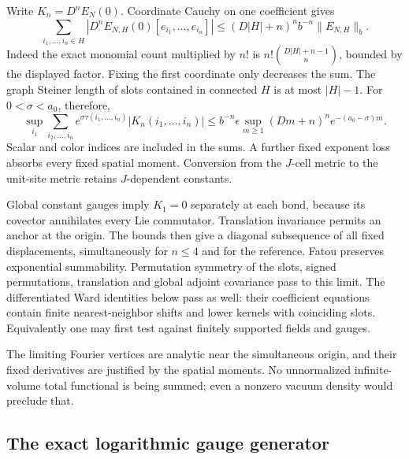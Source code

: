 \documentclass[11pt]{article}
\theoremstyle{remark}
\begin{document}
Write \(K_n=D^nE_N(0)\). Coordinate Cauchy on one coefficient gives
\begin{equation}
 \sum_{i_1,\ldots,i_n\in H}
  |D^nE_{N,H}(0)[e_{i_1},\ldots,e_{i_n}]|
 \le (D|H|+n)^n b^{-n}\|E_{N,H}\|_b .
 \label{tkw-coordinate-Cauchy}
\end{equation}
Indeed the exact monomial count multiplied by \(n!\) is
\(n!\binom{D|H|+n-1}{n}\), bounded by the displayed factor.
Fixing the first coordinate only decreases the sum. The graph
Steiner length of slots contained in connected \(H\) is at most
\(|H|-1\). For \(0<\sigma<a_0\), therefore,
\begin{equation}
 \sup_{i_1}\sum_{i_2,\ldots,i_n}
 e^{\sigma\tau(i_1,\ldots,i_n)}
 |K_n(i_1,\ldots,i_n)|
 \le b^{-n}\epsilon
       \sup_{m\ge1}(Dm+n)^n e^{-(a_0-\sigma)m}.
 \label{tkw-kernel-bound}
\end{equation}
Scalar and color indices are included in the sums. A further fixed
exponent loss absorbs every fixed spatial moment. Conversion from
the \(J\)-cell metric to the unit-site metric retains \(J\)-dependent
constants.

Global constant gauges imply \(K_1=0\) separately at each bond,
because its covector annihilates every Lie commutator. Translation
invariance permits an anchor at the origin. The bounds then give a
diagonal subsequence of all fixed displacements, simultaneously for
\(n\le4\) and for the reference. Fatou preserves exponential
summability. Permutation symmetry of the slots, signed permutations,
translation and global adjoint covariance pass to this limit.
The differentiated Ward identities below pass as well: their
coefficient equations contain finite nearest-neighbor shifts and
lower kernels with coinciding slots. Equivalently one may first
test against finitely supported fields and gauges.

The limiting Fourier vertices are analytic near the simultaneous
origin, and their fixed derivatives are justified by the spatial
moments. No unnormalized infinite-volume total functional is being
summed; even a nonzero vacuum density would preclude that.

\subsection{The exact logarithmic gauge generator}
\label{tkw-generator-section}
\end{document}
